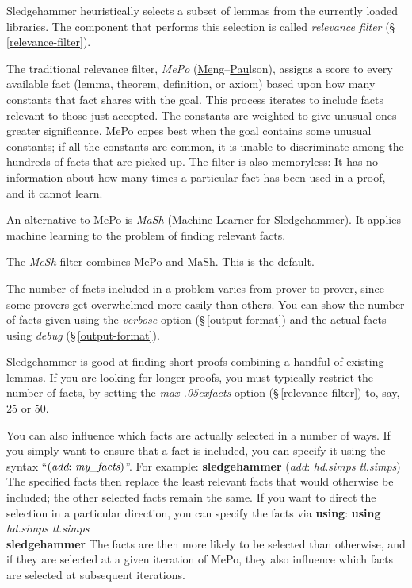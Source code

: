 \documentclass[a4paper,12pt]{article}
\let\oldS=\S
\def\S{\oldS\,}
\renewcommand\_{\hbox{\textunderscore\kern-.05ex}}
\begin{document}

Sledgehammer heuristically selects a subset of lemmas from the currently loaded
libraries. The component that performs this selection is called \emph{relevance
filter} (\S\ref{relevance-filter}).

\begin{enum}
\item[\labelitemi]
The traditional relevance filter, \emph{MePo}
(\underline{Me}ng--\underline{Pau}lson), assigns a score to every available
fact (lemma, theorem, definition, or axiom) based upon how many constants that
fact shares with the goal. This process iterates to include facts
relevant to those just accepted. The constants are weighted to give unusual
ones greater significance. MePo copes best when the goal contains some
unusual constants; if all the constants are common, it is unable to
discriminate among the hundreds of facts that are picked up. The filter is also
memoryless: It has no information about how many times a particular fact has
been used in a proof, and it cannot learn.

\item[\labelitemi]
An alternative to MePo is \emph{MaSh} (\underline{Ma}chine Learner for
\underline{S}ledge\underline{h}ammer). It applies machine learning to the
problem of finding relevant facts.

\item[\labelitemi] The \emph{MeSh} filter combines MePo and MaSh. This is
the default.
\end{enum}

The number of facts included in a problem varies from prover to prover, since
some provers get overwhelmed more easily than others. You can show the number of
facts given using the \textit{verbose} option (\S\ref{output-format}) and the
actual facts using \textit{debug} (\S\ref{output-format}).

Sledgehammer is good at finding short proofs combining a handful of existing
lemmas. If you are looking for longer proofs, you must typically restrict the
number of facts, by setting the \textit{max\_facts} option
(\S\ref{relevance-filter}) to, say, 25 or 50.

You can also influence which facts are actually selected in a number of ways. If
you simply want to ensure that a fact is included, you can specify it using the
syntax ``$(\textit{add}{:}~\textit{my\_facts})$''. For example:
%
\prew
\textbf{sledgehammer} (\textit{add}: \textit{hd.simps} \textit{tl.simps})
\postw
%
The specified facts then replace the least relevant facts that would otherwise be
included; the other selected facts remain the same.
If you want to direct the selection in a particular direction, you can specify
the facts via \textbf{using}:
%
\prew
\textbf{using} \textit{hd.simps} \textit{tl.simps} \\
\textbf{sledgehammer}
\postw
%
The facts are then more likely to be selected than otherwise, and if they are
selected at a given iteration of MePo, they also influence which facts are
selected at subsequent iterations.
\end{document}
